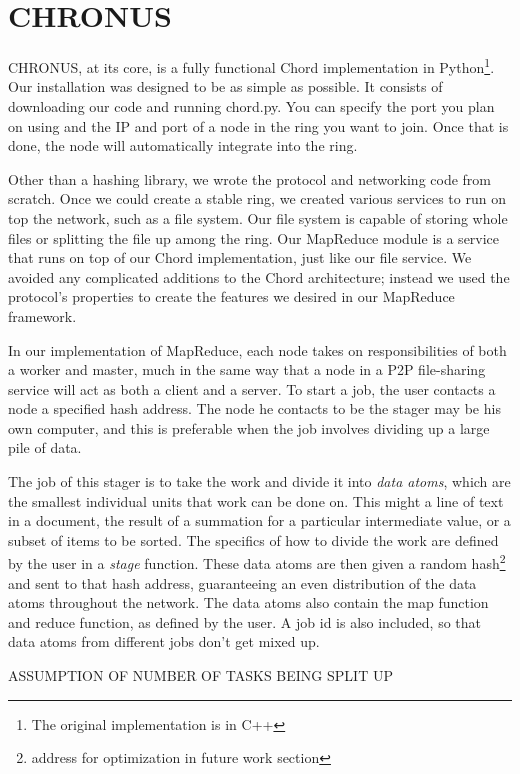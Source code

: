 \documentclass[conference, compsocconf, letterpaper]{IEEEtran}
\begin{document}
\section{CHRONUS}

CHRONUS, at its core, is a fully functional Chord implementation in Python\footnote{The original implementation is in C++}.  Our installation was designed to be as simple as possible.   It consists of downloading our code\cite{code} and running chord.py.  You can specify the port you plan on using and the IP and port of a node in the ring you want to join.  Once that is done, the node will automatically integrate into the ring.

Other than a hashing library, we wrote the protocol and networking code from scratch.  Once we could create a stable ring, we created various services to run on top the network, such as a file system.  Our file system is capable of storing whole files or splitting the file up among the ring. Our MapReduce module is a service that runs on top of our Chord implementation, just like our file service.    We avoided any complicated additions to the Chord architecture; instead we used the protocol's properties to create the features we desired in our MapReduce framework. 
  
In our implementation of MapReduce, each node takes on responsibilities of both a worker and master, much in the same way that a node in a P2P file-sharing service will act as both a client and a server.  To start a job, the user contacts a node a specified hash address. The node he contacts to be the stager may be his own computer, and this is preferable when the job involves dividing up a large pile of data. 

The job of this stager is to take the work and divide it into \emph{data atoms}, which are the smallest individual units that work can be done on.  This might a line of text in a document, the result of a summation for a particular intermediate value, or a subset of items to be sorted.  The specifics of how to divide the work are defined by the user in a \emph{stage} function.  These data atoms are then given a random hash\footnote{address for optimization in future work section} and sent to that hash address, guaranteeing an even distribution of the data atoms throughout the network.  The data atoms also contain the map function and reduce function, as defined by the user.  A job id is also included, so that data atoms from different jobs don't get mixed up.

ASSUMPTION OF NUMBER OF TASKS BEING SPLIT UP
\end{document}
